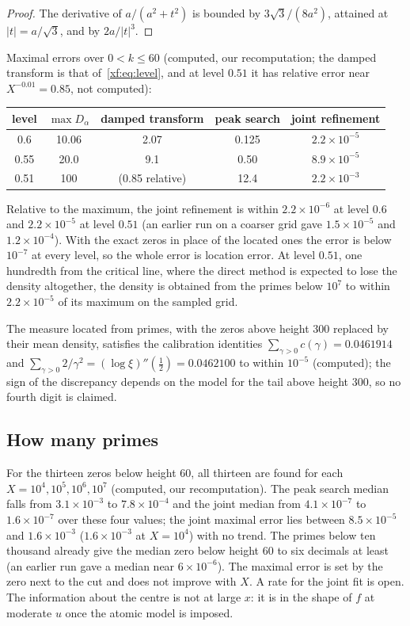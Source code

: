 \begin{proof}
The derivative of $a/(a^2+t^2)$ is bounded by $3\sqrt3/(8a^2)$, attained at $|t|=a/\sqrt3$, and by $2a/|t|^3$.
\end{proof}

Maximal errors over $0<k\le60$ (computed, our recomputation; the damped transform is that of~\eqref{xf:eq:level}, and at level $0.51$ it has relative error near $X^{-0.01}=0.85$, not computed):
\begin{center}
\small
\begin{tabular}{ccccc}
\toprule
level & $\max D_\alpha$ & damped transform & peak search & joint refinement\\
\midrule
0.6 & 10.06 & 2.07 & 0.125 & $2.2\times10^{-5}$\\
0.55 & 20.0 & 9.1 & 0.50 & $8.9\times10^{-5}$\\
0.51 & 100 & (0.85 relative) & 12.4 & $2.2\times10^{-3}$\\
\bottomrule
\end{tabular}
\end{center}
Relative to the maximum, the joint refinement is within $2.2\times10^{-6}$ at level $0.6$ and $2.2\times10^{-5}$ at level $0.51$ (an earlier run on a coarser grid gave $1.5\times10^{-5}$ and $1.2\times10^{-4}$). With the exact zeros in place of the located ones the error is below $10^{-7}$ at every level, so the whole error is location error. At level $0.51$, one hundredth from the critical line, where the direct method is expected to lose the density altogether, the density is obtained from the primes below $10^7$ to within $2.2\times10^{-5}$ of its maximum on the sampled grid.

The measure located from primes, with the zeros above height $300$ replaced by their mean density, satisfies the calibration identities $\sum_{\gamma>0}c(\gamma)=0.0461914$ and $\sum_{\gamma>0}2/\gamma^2=(\log\xi)''(\frac12)=0.0462100$ to within $10^{-5}$ (computed); the sign of the discrepancy depends on the model for the tail above height $300$, so no fourth digit is claimed.

\subsection*{How many primes}
For the thirteen zeros below height $60$, all thirteen are found for each $X=10^4,10^5,10^6,10^7$ (computed, our recomputation). The peak search median falls from $3.1\times10^{-3}$ to $7.8\times10^{-4}$ and the joint median from $4.1\times10^{-7}$ to $1.6\times10^{-7}$ over these four values; the joint maximal error lies between $8.5\times10^{-5}$ and $1.6\times10^{-3}$ ($1.6\times10^{-3}$ at $X=10^4$) with no trend.
The primes below ten thousand already give the median zero below height $60$ to six decimals at least (an earlier run gave a median near $6\times10^{-6}$). The maximal error is set by the zero next to the cut and does not improve with $X$. A rate for the joint fit is open. The information about the centre is not at large $x$: it is in the shape of $f$ at moderate $u$ once the atomic model is imposed.

